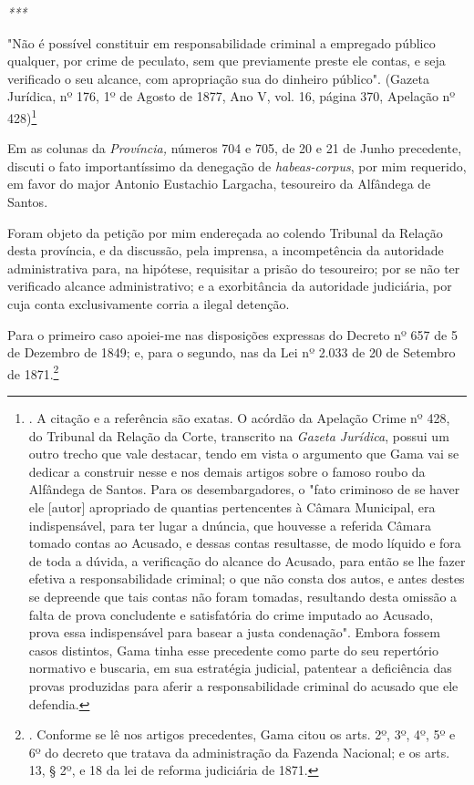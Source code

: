\emph{***}

"Não é possível constituir em responsabilidade criminal a empregado
público qualquer, por crime de peculato, sem que previamente preste ele
contas, e seja verificado o seu alcance, com apropriação sua do dinheiro
público". (Gazeta Jurídica, nº 176, 1º de Agosto de 1877, Ano V, vol.
16, página 370, Apelação nº 428)\footnote{. A citação e a referência são
  exatas. O acórdão da Apelação Crime nº 428, do Tribunal da Relação da
  Corte, transcrito na \emph{Gazeta Jurídica}, possui um outro trecho
  que vale destacar, tendo em vista o argumento que Gama vai se dedicar
  a construir nesse e nos demais artigos sobre o famoso roubo da
  Alfândega de Santos. Para os desembargadores, o "fato criminoso de se
  haver ele {[}autor{]} apropriado de quantias pertencentes à Câmara
  Municipal, era indispensável, para ter lugar a dnúncia, que houvesse a
  referida Câmara tomado contas ao Acusado, e dessas contas resultasse,
  de modo líquido e fora de toda a dúvida, a verificação do alcance do
  Acusado, para então se lhe fazer efetiva a responsabilidade criminal;
  o que não consta dos autos, e antes destes se depreende que tais
  contas não foram tomadas, resultando desta omissão a falta de prova
  concludente e satisfatória do crime imputado ao Acusado, prova essa
  indispensável para basear a justa condenação". Embora fossem casos
  distintos, Gama tinha esse precedente como parte do seu repertório
  normativo e buscaria, em sua estratégia judicial, patentear a
  deficiência das provas produzidas para aferir a responsabilidade
  criminal do acusado que ele defendia.}

Em as colunas da \emph{Província,} números 704 e 705, de 20 e 21 de
Junho precedente, discuti o fato importantíssimo da denegação de
\emph{habeas-corpus}, por mim requerido, em favor do major Antonio
Eustachio Largacha, tesoureiro da Alfândega de Santos.

Foram objeto da petição por mim endereçada ao colendo Tribunal da
Relação desta província, e da discussão, pela imprensa, a incompetência
da autoridade administrativa para, na hipótese, requisitar a prisão do
tesoureiro; por se não ter verificado alcance administrativo; e a
exorbitância da autoridade judiciária, por cuja conta exclusivamente
corria a ilegal detenção.

Para o primeiro caso apoiei-me nas disposições expressas do Decreto nº
657 de 5 de Dezembro de 1849; e, para o segundo, nas da Lei nº 2.033 de
20 de Setembro de 1871.\footnote{. Conforme se lê nos artigos
  precedentes, Gama citou os arts. 2º, 3º, 4º, 5º e 6º do decreto que
  tratava da administração da Fazenda Nacional; e os arts. 13, § 2º, e
  18 da lei de reforma judiciária de 1871.}

